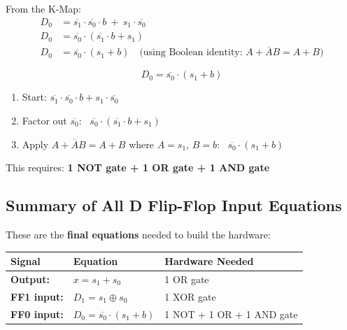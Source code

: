 \documentclass[12pt, a4paper]{article}
\begin{document}
From the K-Map:
\begin{align}
  D_0 &= \overline{s_1} \cdot \overline{s_0} \cdot b \ + \ s_1 \cdot \overline{s_0} \\[6pt]
  D_0 &= \overline{s_0} \cdot (\overline{s_1} \cdot b + s_1) \\[6pt]
  D_0 &= \overline{s_0} \cdot (s_1 + b) \quad \text{(using Boolean identity: } A + \overline{A}B = A + B\text{)}
\end{align}

\begin{equation}
  \boxed{D_0 = \overline{s_0} \cdot (s_1 + b)}
\end{equation}

\begin{tip}
  \begin{enumerate}
    \item Start: $\overline{s_1} \cdot \overline{s_0} \cdot b + s_1 \cdot \overline{s_0}$
    \item Factor out $\overline{s_0}$: \ $\overline{s_0} \cdot (\overline{s_1} \cdot b + s_1)$
    \item Apply $A + \overline{A}B = A+B$ where $A = s_1$, $B = b$: \ $\overline{s_0} \cdot (s_1 + b)$
  \end{enumerate}
  This requires: \textbf{1 NOT gate + 1 OR gate + 1 AND gate}
\end{tip}

\subsection{Summary of All D Flip-Flop Input Equations}

\begin{keypoint}
  These are the \textbf{final equations} needed to build the hardware:\\[8pt]
  \renewcommand{\arraystretch}{1.8}
  \begin{tabular}{@{} >{\bfseries}l l l @{}}
    Signal & Equation & Hardware Needed \\
    \hline
    Output: & $x = s_1 + s_0$ & 1 OR gate \\
    FF1 input: & $D_1 = s_1 \oplus s_0$ & 1 XOR gate \\
    FF0 input: & $D_0 = \overline{s_0} \cdot (s_1 + b)$ & 1 NOT + 1 OR + 1 AND gate \\
  \end{tabular}
\end{keypoint}
\end{document}
